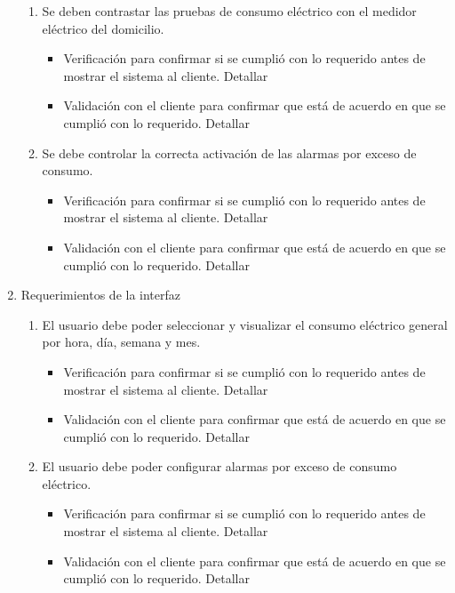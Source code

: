 \documentclass[
11pt, %
]{charter}
\begin{document}
\begin{enumerate}
\begin{enumerate}
		\item Se deben contrastar las pruebas de consumo eléctrico con el medidor eléctrico del domicilio.
			\begin{itemize}
			\item Verificación para confirmar si se cumplió con lo requerido antes de mostrar el sistema al cliente. Detallar 
			\item Validación con el cliente para confirmar que está de acuerdo en que se cumplió con lo requerido. Detallar  
			\end{itemize}
		\item Se debe controlar la correcta activación de las alarmas por exceso de consumo.
		\begin{itemize}
			\item Verificación para confirmar si se cumplió con lo requerido antes de mostrar el sistema al cliente. Detallar 
			\item Validación con el cliente para confirmar que está de acuerdo en que se cumplió con lo requerido. Detallar  
			\end{itemize}				
		\end{enumerate}
	\item Requerimientos de la interfaz
		\begin{enumerate}
			\item El usuario debe poder seleccionar y visualizar el consumo eléctrico general por hora, día, semana y mes.
				\begin{itemize}
			\item Verificación para confirmar si se cumplió con lo requerido antes de mostrar el sistema al cliente. Detallar 
			\item Validación con el cliente para confirmar que está de acuerdo en que se cumplió con lo requerido. Detallar  
			\end{itemize}
			\item El usuario debe poder configurar alarmas por exceso de consumo eléctrico.	
				\begin{itemize}
			\item Verificación para confirmar si se cumplió con lo requerido antes de mostrar el sistema al cliente. Detallar 
			\item Validación con el cliente para confirmar que está de acuerdo en que se cumplió con lo requerido. Detallar  
			\end{itemize}
		 
		\end{enumerate}
	

\end{enumerate}
\end{document}
